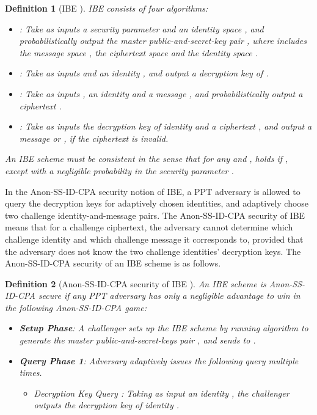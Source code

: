 \documentclass[10pt,twocolumn,twoside]{IEEEtran}
\newtheorem{definition}{Definition}
\begin{document}
{\begin{definition}[IBE \cite{BF01}]\label{D.IBE}
IBE consists of four algorithms:
\begin{itemize}
\item : Take as inputs a security parameter  and an identity space , and probabilistically output the master public-and-secret-key pair , where  includes the message space , the ciphertext space  and the identity space .

\item : Take as inputs  and an identity , and output a decryption key  of .

\item : Take as inputs , an identity  and a message , and probabilistically output a ciphertext .

\item : Take as inputs the decryption key  of identity  and a ciphertext , and output a message or , if the ciphertext is invalid.
\end{itemize}

An IBE scheme must be consistent in the sense that for any  and ,  holds if , except with a negligible probability in the security parameter .
\end{definition}

In the Anon-SS-ID-CPA security notion of IBE, a PPT adversary is allowed to query the decryption keys for adaptively chosen identities, and adaptively choose two challenge identity-and-message pairs. The Anon-SS-ID-CPA security of IBE means that for a challenge ciphertext, the adversary cannot determine which challenge identity and which challenge message it corresponds to, provided that the adversary does not know the two challenge identities' decryption keys. The Anon-SS-ID-CPA security of an IBE scheme is as follows. 

\begin{definition}[Anon-SS-ID-CPA security of IBE \cite{ABN10}] 
An IBE scheme is Anon-SS-ID-CPA secure if any PPT adversary  has only a negligible advantage  to win in the following Anon-SS-ID-CPA game:

\begin{itemize}
\item \textbf{Setup Phase}: A challenger sets up the IBE scheme by running algorithm  to generate the master public-and-secret-keys pair , and sends  to . 

\item \textbf{Query Phase 1}: Adversary  adaptively issues the following query multiple times.
\begin{itemize}
\item Decryption Key Query : Taking as input an identity , the challenger outputs the decryption key of identity . 
\end{itemize}


\end{itemize}
\end{definition}}
\end{document}
